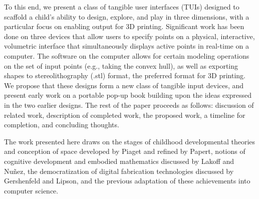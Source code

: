 To this end, we present a class of tangible user interfaces (TUIs) designed to
scaffold a child's ability to design, explore, and play in three dimensions,
with a particular focus on enabling output for 3D printing.
Significant work has been done on three devices that allow users to specify
points on a physical, interactive, volumetric interface that simultaneously displays
active points in real-time on a computer. The software on the computer allows
for certain modeling operations on the set of input points (e.g., taking the
convex hull), as well as exporting shapes to stereolithography (.stl) format,
the preferred format for 3D printing. We propose that these designs form a new
class of tangible input devices, and present early work on a portable pop-up
book building upon the ideas expressed in the two earlier designs. The rest of
the paper proceeds as follows: discussion of related work, description of
completed work, the proposed work, a timeline for completion, and concluding
thoughts.

The work presented here draws on the stages of childhood developmental theories
and conception of space developed by Piaget and refined by Papert, notions of
cognitive development and embodied mathematics discussed by Lakoff and Nu\~nez,
the democratization of digital fabrication technologies discussed by Gershenfeld
and Lipson, and the previous adaptation of these achievements into computer
science.


% 
